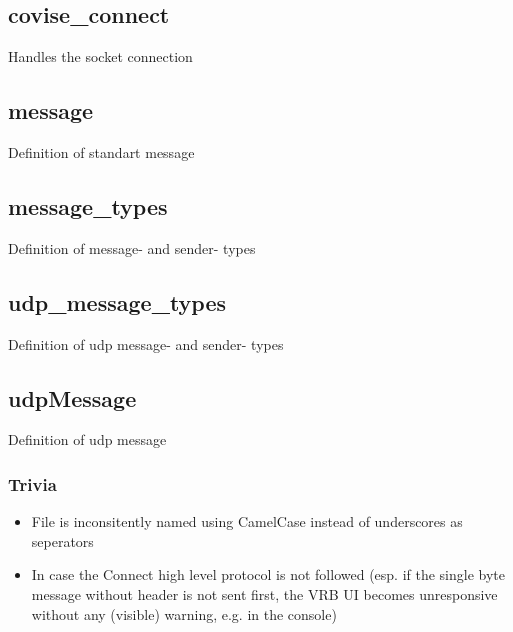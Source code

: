 \subsection{covise\_connect}

Handles the socket connection 

\subsection{message}

Definition of standart message

\subsection{message\_types}

Definition of message- and sender- types 

\subsection{udp\_message\_types}
Definition of udp message- and sender- types 

\subsection{udpMessage}
Definition of udp message


\subsubsection{Trivia}

\begin{itemize}
	\item File is inconsitently named using CamelCase instead of underscores as seperators
	\item In case the Connect high level protocol is not followed (esp. if the single byte message without header is not sent first, the VRB UI becomes unresponsive without any (visible) warning, e.g. in the console)
\end{itemize}
